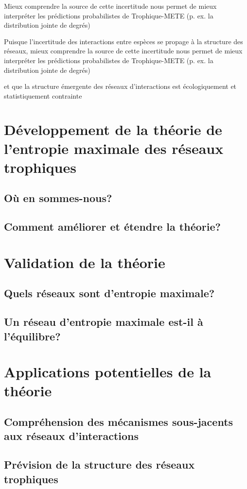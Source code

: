 Mieux
comprendre la source de cette incertitude nous permet de mieux interpréter les
prédictions probabilistes de Trophique-METE (p. ex. la distribution jointe de
degrés) 


Puisque l'incertitude
des interactions entre espèces se propage à la structure des réseaux, mieux
comprendre la source de cette incertitude nous permet de mieux interpréter les
prédictions probabilistes de Trophique-METE (p. ex. la distribution jointe de
degrés) 

 


et
que la structure émergente des réseaux d’interactions est écologiquement et statistiquement
contrainte

\section{Développement de la théorie de l'entropie maximale des réseaux trophiques} 

\subsection{Où en sommes-nous?} 

\subsection{Comment améliorer et étendre la théorie?} 




\section{Validation de la théorie} 

\subsection{Quels réseaux sont d'entropie maximale?} 

\subsection{Un réseau d'entropie maximale est-il à l'équilibre?} 



\section{Applications potentielles de la théorie} 

\subsection{Compréhension des mécanismes sous-jacents aux réseaux d'interactions} 

\subsection{Prévision de la structure des réseaux trophiques} 

\endinput
